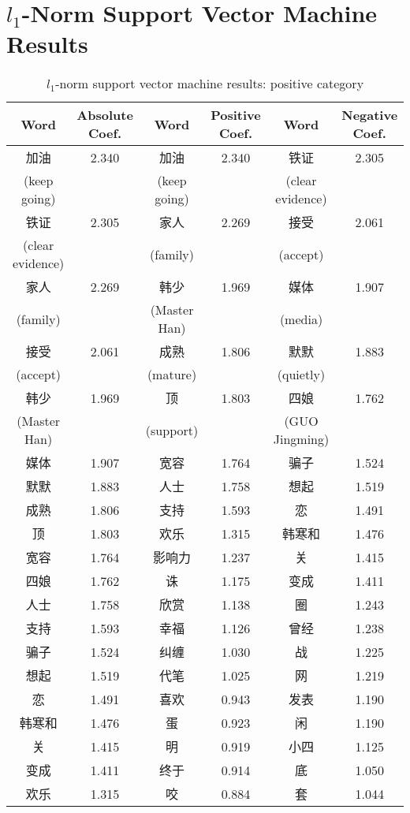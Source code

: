 \documentclass[11pt]{article}
\newcommand{\1}[1]{{\mathbf 1}\left\{#1\right\}}        %
\begin{document}
\newpage
\section{$l_1$-Norm Support Vector Machine Results}

\begin{table}[h!]
\caption{$l_1$-norm support vector machine results: positive category}
\begin{center}
\begin{tabular}{|c|c||c|c||c|c|}
\hline
Word & Absolute Coef. & Word & Positive Coef. & Word & Negative Coef.\\ \hline \hline
加油 & 2.340 & 加油 & 2.340 & 铁证 & 2.305\\
(keep going) & & (keep going) & & (clear evidence) & \\\hline
铁证 & 2.305 & 家人 & 2.269 & 接受 & 2.061\\
(clear evidence) & & (family) & & (accept) & \\\hline
家人 & 2.269 & 韩少 & 1.969 & 媒体 & 1.907\\
(family) & & (Master Han) & & (media) & \\\hline
接受 & 2.061 & 成熟 & 1.806 & 默默 & 1.883\\
(accept) & & (mature) & & (quietly) & \\\hline
韩少 & 1.969 & 顶 & 1.803 & 四娘 & 1.762\\
(Master Han) & & (support) & & (GUO Jingming) & \\\hline
媒体 & 1.907 & 宽容 & 1.764 & 骗子 & 1.524\\ \hline
默默 & 1.883 & 人士 & 1.758 & 想起 & 1.519\\ \hline
成熟 & 1.806 & 支持 & 1.593 & 恋 & 1.491\\ \hline
顶 & 1.803 & 欢乐 & 1.315 & 韩寒和 & 1.476\\ \hline
宽容 & 1.764 & 影响力 & 1.237 & 关 & 1.415\\ \hline
四娘 & 1.762 & 诛 & 1.175 & 变成 & 1.411\\ \hline
人士 & 1.758 & 欣赏 & 1.138 & 圈 & 1.243\\ \hline
支持 & 1.593 & 幸福 & 1.126 & 曾经 & 1.238\\ \hline
骗子 & 1.524 & 纠缠 & 1.030 & 战 & 1.225\\ \hline
想起 & 1.519 & 代笔 & 1.025 & 网 & 1.219\\ \hline
恋 & 1.491 & 喜欢 & 0.943 & 发表 & 1.190\\ \hline
韩寒和 & 1.476 & 蛋 & 0.923 & 闲 & 1.190\\ \hline
关 & 1.415 & 明 & 0.919 & 小四 & 1.125\\ \hline
变成 & 1.411 & 终于 & 0.914 & 底 & 1.050\\ \hline
欢乐 & 1.315 & 咬 & 0.884 & 套 & 1.044\\ \hline
\end{tabular}
\end{center}
\end{table}
\end{document}
